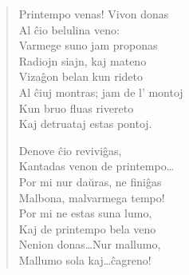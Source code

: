 \begin{verse}
                        Printempo venas! Vivon donas\\
                        Al \^cio belulina veno:\\
                        Varmege suno jam proponas\\
                        Radiojn siajn, kaj mateno\\
                        Viza\^gon belan kun rideto\\
                        Al \^ciuj montras; jam de l' montoj\\
                        Kun bruo fluas rivereto\\
                        Kaj detruataj estas pontoj.

                        Denove \^cio revivi\^gas,\\
                        Kantadas venon de printempo\dots\\
                        Por mi nur da\u uras, ne fini\^gas\\
                        Malbona, malvarmega tempo!\\
                        Por mi ne estas suna lumo,\\
                        Kaj de printempo bela veno\\
                        Nenion donas\dots Nur mallumo,\\
                        Mallumo sola kaj\dots \^cagreno!
                        
\end{verse}


\smallrule{}
